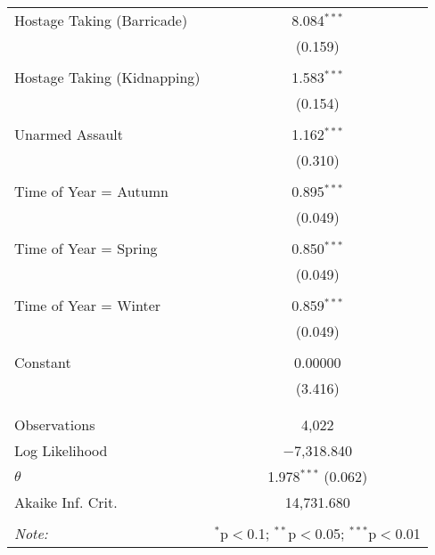 \begin{table}[!htbp]
\begin{tabular}{@{\extracolsep{0.1pt}}lc}
 Hostage Taking (Barricade) & 8.084$^{***}$ \\ 
  & (0.159) \\ 
  & \\ 
 Hostage Taking (Kidnapping) & 1.583$^{***}$ \\ 
  & (0.154) \\ 
  & \\ 
 Unarmed Assault & 1.162$^{***}$ \\ 
  & (0.310) \\ 
  & \\ 
 Time of Year = Autumn & 0.895$^{***}$ \\ 
  & (0.049) \\ 
  & \\ 
 Time of Year = Spring & 0.850$^{***}$ \\ 
  & (0.049) \\ 
  & \\ 
 Time of Year = Winter & 0.859$^{***}$ \\ 
  & (0.049) \\ 
  & \\ 
 Constant & 0.00000 \\ 
  & (3.416) \\ 
  & \\ 
\hline \\[-1.8ex] 
Observations & 4,022 \\ 
Log Likelihood & $-$7,318.840 \\ 
$\theta$ & 1.978$^{***}$  (0.062) \\ 
Akaike Inf. Crit. & 14,731.680 \\ 
\hline 
\hline \\[-1.8ex] 
\textit{Note:}  & \multicolumn{1}{r}{$^{*}$p$<$0.1; $^{**}$p$<$0.05; $^{***}$p$<$0.01} \\ 
\end{tabular} 
\end{table} 
